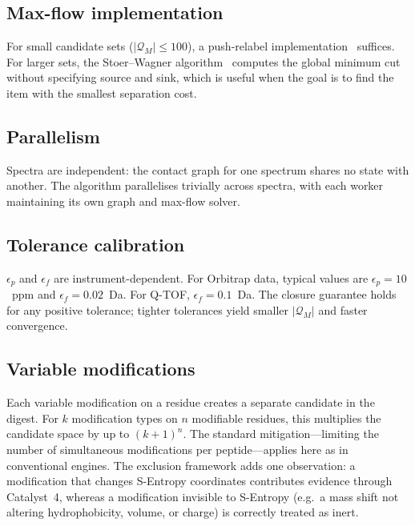 \documentclass[11pt,a4paper]{article}
\theoremstyle{definition}
\theoremstyle{remark}
\newcommand{\Pep}{\mathcal{Q}}
\begin{document}
\subsection{Max-flow implementation}

For small candidate sets ($|\Pep_M|\le 100$), a push-relabel
implementation~\citep{goldberg1988new} suffices. For larger sets, the
Stoer--Wagner algorithm~\citep{stoerwagner1997} computes the global
minimum cut without specifying source and sink, which is useful when
the goal is to find the item with the smallest separation cost.

\subsection{Parallelism}

Spectra are independent: the contact graph for one spectrum shares no
state with another. The algorithm parallelises trivially across spectra,
with each worker maintaining its own graph and max-flow solver.

\subsection{Tolerance calibration}

$\epsilon_p$ and $\epsilon_f$ are instrument-dependent. For Orbitrap
data, typical values are $\epsilon_p=10$~ppm and $\epsilon_f=0.02$~Da.
For Q-TOF, $\epsilon_f=0.1$~Da. The closure guarantee holds for any
positive tolerance; tighter tolerances yield smaller $|\Pep_M|$ and
faster convergence.

\subsection{Variable modifications}

Each variable modification on a residue creates a separate candidate in
the digest. For $k$ modification types on $n$ modifiable residues, this
multiplies the candidate space by up to $(k+1)^n$. The standard
mitigation---limiting the number of simultaneous modifications per
peptide---applies here as in conventional engines. The exclusion
framework adds one observation: a modification that changes S-Entropy
coordinates contributes evidence through Catalyst~4, whereas a
modification invisible to S-Entropy (e.g.\ a mass shift not altering
hydrophobicity, volume, or charge) is correctly treated as inert.

\end{document}
